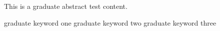 \documentclass[degree=master, academic=true, fontset=fandol]{nwputhesis}
\begin{document}
\START
\showoutput

\frontmatter

\begin{abstract}
    这是研究生测试摘要内容。
    \begin{keywords}
        研究生关键词一 \sep 研究生关键词二 \sep 研究生关键词三
    \end{keywords}
\end{abstract}

\begin{engabstract}
    This is a graduate abstract test content.
    \begin{engkeywords}
        graduate keyword one \ensep graduate keyword two \ensep graduate keyword three
    \end{engkeywords}
\end{engabstract}

\clearpage
\OMIT
\end{document}
